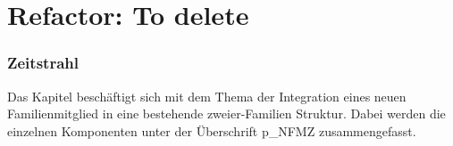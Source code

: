 









\part{Refactor: To delete}


\section{Zeitstrahl}   

Das Kapitel beschäftigt sich mit dem Thema der Integration eines neuen Familienmitglied in eine bestehende zweier-Familien Struktur. Dabei werden die einzelnen Komponenten unter der Überschrift \gls{p_NFMZ} zusammengefasst.\\

